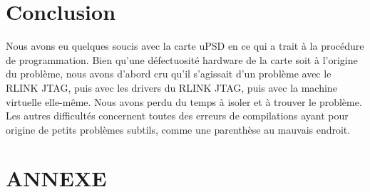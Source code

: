 \documentclass[10pt,a4paper,final]{article}
\begin{document}
\section{Conclusion}
Nous avons eu quelques soucis avec la carte uPSD en ce qui a trait à la procédure de programmation. Bien qu'une défectuosité hardware de la carte soit à l'origine du problème, nous avons d'abord cru qu'il s'agissait d'un problème avec le RLINK JTAG, puis avec les drivers du RLINK JTAG, puis avec la machine virtuelle elle-même. Nous avons perdu du temps à isoler et à trouver le problème. Les autres difficultés concernent toutes des erreurs de compilations ayant pour origine de petits problèmes subtils, comme une parenthèse au mauvais endroit.






























\pagebreak
{}
\section{ANNEXE}
\end{document}
